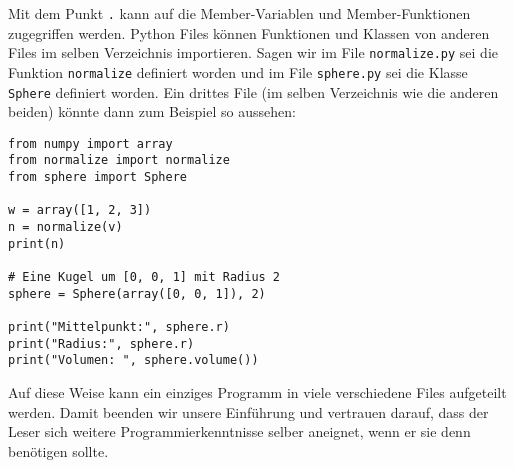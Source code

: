 Mit dem Punkt \texttt{.} kann auf die Member-Variablen und Member-Funktionen zugegriffen werden.
Python Files können Funktionen und Klassen von anderen Files im selben Verzeichnis importieren.
Sagen wir im File \texttt{normalize.py} sei die Funktion \texttt{normalize} definiert worden und im File \texttt{sphere.py} sei die Klasse \texttt{Sphere} definiert worden.
Ein drittes File (im selben Verzeichnis wie die anderen beiden) könnte dann zum Beispiel so aussehen:
\begin{lstlisting}[style=python]
from numpy import array
from normalize import normalize
from sphere import Sphere

w = array([1, 2, 3])
n = normalize(v)
print(n)

# Eine Kugel um [0, 0, 1] mit Radius 2
sphere = Sphere(array([0, 0, 1]), 2)

print("Mittelpunkt:", sphere.r)
print("Radius:", sphere.r)
print("Volumen: ", sphere.volume())
\end{lstlisting}
Auf diese Weise kann ein einziges Programm in viele verschiedene Files aufgeteilt werden.
Damit beenden wir unsere Einführung und vertrauen darauf, dass der Leser sich weitere Programmierkenntnisse selber aneignet, wenn er sie denn benötigen sollte.